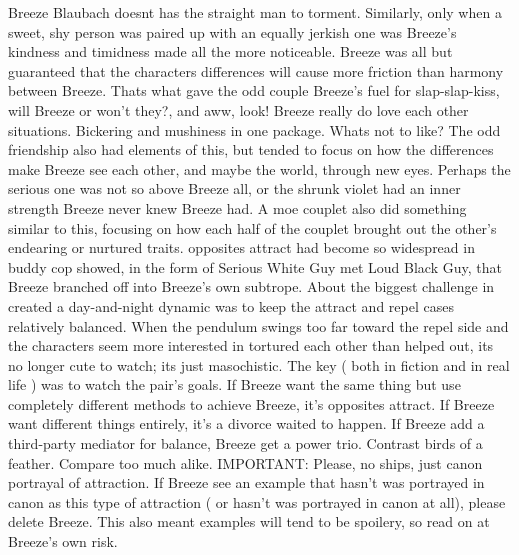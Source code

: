 \documentclass[12pt]{book}
\begin{document}
Breeze Blaubach doesnt has the straight man to torment. Similarly, only when a sweet, shy person was paired up with an equally jerkish one was Breeze's kindness and timidness made all the more noticeable. Breeze was all but guaranteed that the characters differences will cause more friction than harmony between Breeze. Thats what gave the odd couple Breeze's fuel for slap-slap-kiss, will Breeze or won't they?, and aww, look! Breeze really do love each other situations. Bickering and mushiness in one package. Whats not to like? The odd friendship also had elements of this, but tended to focus on how the differences make Breeze see each other, and maybe the world, through new eyes. Perhaps the serious one was not so above Breeze all, or the shrunk violet had an inner strength Breeze never knew Breeze had. A moe couplet also did something similar to this, focusing on how each half of the couplet brought out the other's endearing or nurtured traits. opposites attract had become so widespread in buddy cop showed, in the form of Serious White Guy met Loud Black Guy, that Breeze branched off into Breeze's own subtrope. About the biggest challenge in created a day-and-night dynamic was to keep the attract and repel cases relatively balanced. When the pendulum swings too far toward the repel side and the characters seem more interested in tortured each other than helped out, its no longer cute to watch; its just masochistic. The key ( both in fiction and in real life ) was to watch the pair's goals. If Breeze want the same thing but use completely different methods to achieve Breeze, it's opposites attract. If Breeze want different things entirely, it's a divorce waited to happen. If Breeze add a third-party mediator for balance, Breeze get a power trio. Contrast birds of a feather. Compare too much alike. IMPORTANT: Please, no ships, just canon portrayal of attraction. If Breeze see an example that hasn't was portrayed in canon as this type of attraction ( or hasn't was portrayed in canon at all), please delete Breeze. This also meant examples will tend to be spoilery, so read on at Breeze's own risk.
\end{document}
